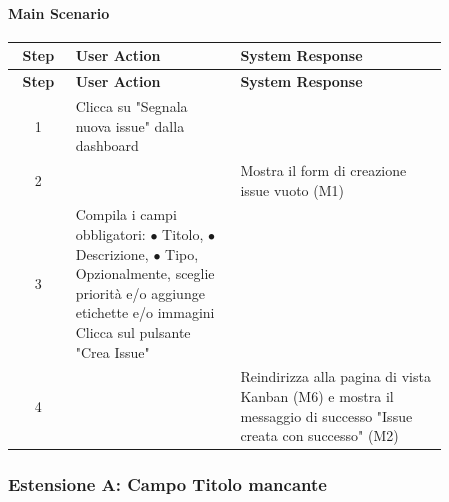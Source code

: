 \newpage

\paragraph*{Main Scenario}

\begin{longtable}{|c|p{0.38\linewidth}|p{0.48\linewidth}|}
\hline
\textbf{Step} & \textbf{User Action} & \textbf{System Response} \\ \hline
\endfirsthead

\hline
\textbf{Step} & \textbf{User Action} & \textbf{System Response} \\ \hline
\endhead

\hline
\endfoot

1 & Clicca su "Segnala nuova issue" dalla dashboard & \\ \hline

2 & & Mostra il form di creazione issue vuoto (M1) \\ \hline

3 & Compila i campi obbligatori: 
\newline $\bullet$ Titolo,
\newline $\bullet$ Descrizione,
\newline $\bullet$ Tipo,
\newline Opzionalmente, sceglie priorità e/o aggiunge etichette e/o immagini
\newline Clicca sul pulsante "Crea Issue" & \\ \hline

4 & & Reindirizza alla pagina di vista Kanban (M6) e mostra il messaggio di successo "Issue creata con successo" (M2) \\ \hline

\end{longtable}

\newpage
\subsubsection*{Estensione A: Campo Titolo mancante}

